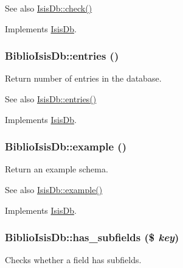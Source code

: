 \begin{DoxySeeAlso}{See also}
\hyperlink{interfaceIsisDb_af681b8f990b579f1835aa7ba4c83f1b8}{IsisDb::check()} 
\end{DoxySeeAlso}


Implements \hyperlink{interfaceIsisDb_af681b8f990b579f1835aa7ba4c83f1b8}{IsisDb}.

\hypertarget{classBiblioIsisDb_ab6b0a977c066c25c6bdca5c1d3a083e8}{
\subsubsection[{entries}]{\setlength{\rightskip}{0pt plus 5cm}BiblioIsisDb::entries ()}}
\label{classBiblioIsisDb_ab6b0a977c066c25c6bdca5c1d3a083e8}
Return number of entries in the database.

\begin{DoxySeeAlso}{See also}
\hyperlink{interfaceIsisDb_a86f38eca2b6d0835b60770d8a4e511ff}{IsisDb::entries()} 
\end{DoxySeeAlso}


Implements \hyperlink{interfaceIsisDb_a86f38eca2b6d0835b60770d8a4e511ff}{IsisDb}.

\hypertarget{classBiblioIsisDb_a8e76b289b9e3a9893b9469094753d2bc}{
\subsubsection[{example}]{\setlength{\rightskip}{0pt plus 5cm}BiblioIsisDb::example ()}}
\label{classBiblioIsisDb_a8e76b289b9e3a9893b9469094753d2bc}
Return an example schema.

\begin{DoxySeeAlso}{See also}
\hyperlink{interfaceIsisDb_a857c10d90da64067efa17afb2f32edb6}{IsisDb::example()} 
\end{DoxySeeAlso}


Implements \hyperlink{interfaceIsisDb_a857c10d90da64067efa17afb2f32edb6}{IsisDb}.

\hypertarget{classBiblioIsisDb_a73d5d998f9ab7e410c5f71f65e83948b}{
\subsubsection[{has\_\-subfields}]{\setlength{\rightskip}{0pt plus 5cm}BiblioIsisDb::has\_\-subfields (\$ {\em key})}}
\label{classBiblioIsisDb_a73d5d998f9ab7e410c5f71f65e83948b}
Checks whether a field has subfields.


